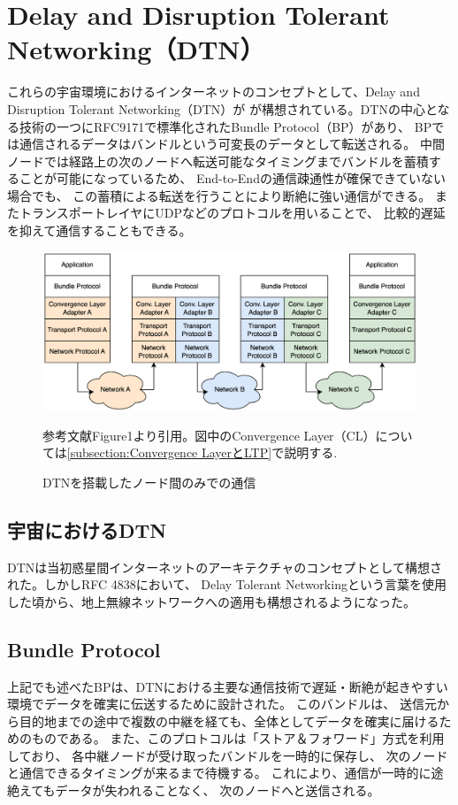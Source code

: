 \section{Delay and Disruption Tolerant Networking（DTN）}
これらの宇宙環境におけるインターネットのコンセプトとして、Delay and Disruption Tolerant Networking（DTN）が
が構想されている。DTNの中心となる技術の一つにRFC9171\cite{rfc9171}で標準化されたBundle Protocol（BP）があり、 
BPでは通信されるデータはバンドルという可変長のデータとして転送される。 
中間ノードでは経路上の次のノードへ転送可能なタイミングまでバンドルを蓄積することが可能になっているため、 
End-to-Endの通信疎通性が確保できていない場合でも、 この蓄積による転送を行うことにより断絶に強い通信ができる。
またトランスポートレイヤにUDPなどのプロトコルを用いることで、 比較的遅延を抑えて通信することもできる。

\cite{bundle_protocol_architecture}

\begin{figure}[tbh]
    \centering
    \includegraphics[width=0.7\textheight]{img/dtnprotocolstack.pdf}
    \caption{DTNを搭載したノード間のみでの通信}
    \label{fig:dtnprotocolstack}
    \begin{minipage}{\textwidth}
        \raggedright
        参考文献\cite{bundle_protocol_architecture}Figure1より引用。図中のConvergence Layer（CL）については\ref{subsection:Convergence LayerとLTP}で説明する.
    \end{minipage}
\end{figure}

\subsection{宇宙におけるDTN}
DTNは当初惑星間インターネットのアーキテクチャのコンセプトとして構想された。しかしRFC 4838\cite{rfc4838}において、
Delay Tolerant Networkingという言葉を使用した頃から、地上無線ネットワークへの適用も構想されるようになった。


\subsection{Bundle Protocol}
\label{subsection:Bundle Protocol}
上記でも述べたBPは、DTNにおける主要な通信技術で遅延・断絶が起きやすい環境でデータを確実に伝送するために設計された。
このバンドルは、 送信元から目的地までの途中で複数の中継を経ても、全体としてデータを確実に届けるためのものである。 
また、このプロトコルは「ストア＆フォワード」方式を利用しており、 各中継ノードが受け取ったバンドルを一時的に保存し、 
次のノードと通信できるタイミングが来るまで待機する。 これにより、通信が一時的に途絶えてもデータが失われることなく、 次のノードへと送信される。

